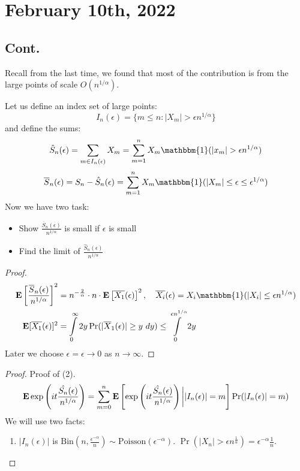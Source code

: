 \documentclass[../main/main.tex]{subfiles}
\begin{document}
\section{February 10th, 2022}
\subsection{Cont.}


Recall from the last time, we found that most of the contribution is from the large points of scale $O(n^{1 / \alpha})$.

Let us define an index set of large points: \[
	I_n(\epsilon) = \{m \leq n: |X_m| > \epsilon n^{1 / \alpha}\}
\] and define the sums: \[
	\hat{S}_n(\epsilon) = \sum\limits_{m \in I_n(\epsilon)}X_m = \sum\limits_{m=1}^{n} X_m \mathbbm{1}(|x_m| > \epsilon n^{1 / \alpha})
\] \[
	\overline{S}_n(\epsilon) = S_n - \hat{S}_n(\epsilon) = \sum\limits_{m=1}^{n} X_m \mathbbm{1}(|X_m| \leq \epsilon \leq \epsilon ^{1 / \alpha})
\]
Now we have two task:

\begin{itemize}
	\item Show $\frac{\overline{S}_n(\epsilon)}{n^{1 / \alpha}}$ is small if $\epsilon$ is small
	\item Find the limit of $\frac{\hat{S}_n(\epsilon)}{n^{1 / \alpha}}$
\end{itemize}

\begin{proof}
	\begin{align*}
		\E \left[ \frac{\overline{S}_n(\epsilon)}{n ^{1 / \alpha}} \right]^2 & = n^{- \frac{2}{\alpha}} \cdot n \cdot \E \left[ \overline{X_1}(\epsilon) \right]^2, \quad \overline{X_i}(\epsilon) = X_i \mathbbm{1}(|X_i| \leq \epsilon n ^{1 / \alpha}) \\
		\E[\overline{X_1}(\epsilon)]^2                                       & = \int\limits_{0}^{\infty} 2 y \Pr(|\overline{X}_1(\epsilon)| \geq y ~ dy) \leq \int\limits_{0}^{\epsilon n^{1 / \alpha}}       2 y                                        \\
	\end{align*}
	Later we choose $\epsilon = \epsilon \to 0$ as $n \to \infty$.
\end{proof}

\begin{proof}
	Proof of (2).
	\begin{align*}
		\text{\textbf{E}} \exp \left( it \frac{\hat{S_n}(\epsilon)}{n^{1 / \alpha}} \right) = \sum\limits_{m=0}^{n} \text{\textbf{E}} \left[ \exp \left( it \frac{\hat{S_n}(\epsilon)}{n^{1 / \alpha}} \right) \bigg| |I_n(\epsilon)| = m \right] \Pr(|I_n(\epsilon)| = m)
	\end{align*}
	We will use two facts:
	\begin{enumerate}
		\item $|I_n(\epsilon)|$ is $\text{Bin} \left( n , \frac{\epsilon^{-\alpha}}{n} \right)\sim \text{Poisson}(\epsilon^{-\alpha}).$ $\Pr(|X_n|>\epsilon n^{\frac{1}{\alpha}}) = \epsilon^{-\alpha} \frac{1}{n}$.
	\end{enumerate}
\end{proof}
\end{document}
